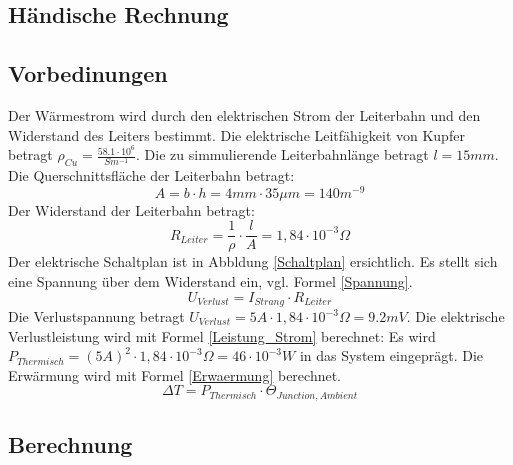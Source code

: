 \documentclass[10pt,a4paper,oneside,abstracton]{scrartcl}
\begin{document}
\begin{multicols}{2}
\section{Händische Rechnung}
\subsection{Vorbedinungen}
Der Wärmestrom wird durch den elektrischen Strom der Leiterbahn und den Widerstand des Leiters bestimmt. 
\newline
Die elektrische Leitfähigkeit von Kupfer betragt 
\newline
$ \rho_{Cu} = \frac{58.1\cdot 10^6}{Sm^{-1}} $.
\newline
Die zu simmulierende Leiterbahnlänge betragt
\newline
 $l = 15 mm$.
\newline
Die Querschnittsfläche der Leiterbahn betragt: 
\begin{equation}
	A = b \cdot h = 4 mm \cdot 35 \mu m = 140 m^{-9}
\end{equation}
Der Widerstand der Leiterbahn betragt: 
\begin{equation}
	R_{Leiter} = \frac{1}{\rho} \cdot \frac{l}{A} = 1,84 \cdot 10^{-3} \Omega
\end{equation}
\noindent
Der elektrische Schaltplan ist in Abbldung \ref*{Schaltplan} ersichtlich.  \newline
Es stellt sich eine Spannung über dem Widerstand ein, vgl. Formel \ref*{Spannung}. 
\begin{equation}
	U_{Verlust} =  I_{Strang} \cdot R_{Leiter}
	\label{Spannung}
\end{equation}
\noindent
Die Verlustspannung betragt $U_{Verlust} = 5A \cdot 1,84 \cdot 10^{-3} \Omega = 9.2 mV$. 
Die elektrische Verlustleistung wird mit Formel \ref*{Leistung_Strom} berechnet: 
Es wird
$ P_{Thermisch} = (5A)^2 \cdot 1,84 \cdot 10^{-3} \Omega = 46 \cdot 10^{-3} W $ 
in das System eingeprägt.
Die Erwärmung wird mit Formel \ref*{Erwaermung} berechnet.
\begin{equation}
	\Delta T = P_{Thermisch} \cdot \Theta_{Junction, Ambient}
	\label{Erwaermung}
\end{equation}

\subsection{Berechnung }


\end{multicols}
\end{document}
